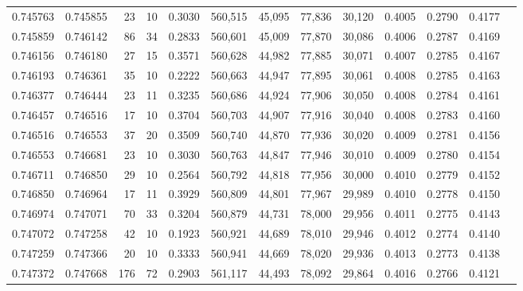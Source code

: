 \begin{tabular}{rrrrrrrrrrrrr}
0.745763 & 0.745855 &    23 &  10 &                                     0.3030 & 560,515 &  45,095 &  77,836 &  30,120 & 0.4005 & 0.2790 & 0.4177 \\
0.745859 & 0.746142 &    86 &  34 &                                     0.2833 & 560,601 &  45,009 &  77,870 &  30,086 & 0.4006 & 0.2787 & 0.4169 \\
0.746156 & 0.746180 &    27 &  15 &                                     0.3571 & 560,628 &  44,982 &  77,885 &  30,071 & 0.4007 & 0.2785 & 0.4167 \\
0.746193 & 0.746361 &    35 &  10 &                                     0.2222 & 560,663 &  44,947 &  77,895 &  30,061 & 0.4008 & 0.2785 & 0.4163 \\
0.746377 & 0.746444 &    23 &  11 &                                     0.3235 & 560,686 &  44,924 &  77,906 &  30,050 & 0.4008 & 0.2784 & 0.4161 \\
0.746457 & 0.746516 &    17 &  10 &                                     0.3704 & 560,703 &  44,907 &  77,916 &  30,040 & 0.4008 & 0.2783 & 0.4160 \\
0.746516 & 0.746553 &    37 &  20 &                                     0.3509 & 560,740 &  44,870 &  77,936 &  30,020 & 0.4009 & 0.2781 & 0.4156 \\
0.746553 & 0.746681 &    23 &  10 &                                     0.3030 & 560,763 &  44,847 &  77,946 &  30,010 & 0.4009 & 0.2780 & 0.4154 \\
0.746711 & 0.746850 &    29 &  10 &                                     0.2564 & 560,792 &  44,818 &  77,956 &  30,000 & 0.4010 & 0.2779 & 0.4152 \\
0.746850 & 0.746964 &    17 &  11 &                                     0.3929 & 560,809 &  44,801 &  77,967 &  29,989 & 0.4010 & 0.2778 & 0.4150 \\
0.746974 & 0.747071 &    70 &  33 &                                     0.3204 & 560,879 &  44,731 &  78,000 &  29,956 & 0.4011 & 0.2775 & 0.4143 \\
0.747072 & 0.747258 &    42 &  10 &                                     0.1923 & 560,921 &  44,689 &  78,010 &  29,946 & 0.4012 & 0.2774 & 0.4140 \\
0.747259 & 0.747366 &    20 &  10 &                                     0.3333 & 560,941 &  44,669 &  78,020 &  29,936 & 0.4013 & 0.2773 & 0.4138 \\
0.747372 & 0.747668 &   176 &  72 &                                     0.2903 & 561,117 &  44,493 &  78,092 &  29,864 & 0.4016 & 0.2766 & 0.4121 \\

\end{tabular}
